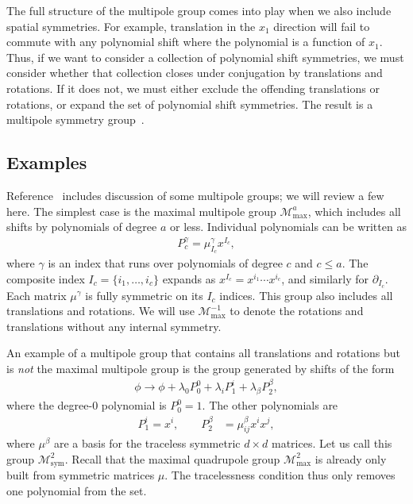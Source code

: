 \documentclass[prb,aps,twocolumn, amsfonts,amsmath,amssymb,nofootinbib,superscriptaddress]{revtex4-2}
\newcommand{\goesto}{\rightarrow}
\renewcommand{\max}{\text{max}}
\newcommand{\mmax}[1]{\mathcal{M}^{#1}_\max}
\begin{document}
The full structure of the multipole group comes into play when we also include spatial symmetries. For example,  translation in the $x_1$ direction will fail to commute with any polynomial shift where the polynomial is a function of $x_1$. Thus, if we want to consider a collection of polynomial shift symmetries, we must consider whether that collection closes under conjugation by translations and rotations. If it does not, we must either exclude the offending translations or rotations, or expand the set of polynomial shift symmetries. The result is a multipole symmetry group~\cite{Gromov2019}.

\subsection{Examples} \label{sub:examples}

Reference~\cite{Gromov2019} includes discussion of some multipole groups; we will review a few here. The simplest case is the maximal multipole group $\mathcal{M}^a_\text{max}$, which includes all shifts by polynomials of degree $a$ or less. Individual polynomials can be written as
\begin{align}
P_c^{\gamma} = \mu^{\gamma}_{I_c}x^{I_c}, \label{eqn:basis}
\end{align}
where $\gamma$ is an index that runs over polynomials of degree $c$ and $c\le a$. The composite index $I_c = \{i_1,\dots,i_c\}$  expands as $x^{I_c}=x^{i_1}\cdots x^{i_c}$, and similarly for $\partial_{I_c}$. Each  matrix  $\mu^{\gamma}$ is fully symmetric on its $I_c$ indices. This group also includes all translations and rotations. We will use $\mmax{-1}$ to denote the rotations and translations without any internal symmetry.

An example of a multipole group that contains all translations and rotations but is \emph{not} the maximal multipole group is the group generated by shifts of the form
\begin{align}
\phi \goesto \phi + \lambda_0 P_0^0 + \lambda_{i} P^{i}_1 + \lambda_{\beta} P^{\beta}_2,
\end{align}
where the degree-0 polynomial is $P_0^0=1$. The other polynomials are
\begin{align}
P_1^{i} = x^i,\quad \quad P_2^{\beta} &= \mu^{\beta}_{ij} x^i x^j,
\end{align}
where $\mu^{\beta}$ are a basis for the traceless symmetric $d\times d$ matrices. Let us call this group $\mathcal{M}^2_{\text{sym}}$. Recall that the maximal quadrupole group $\mathcal{M}^2_{\text{max}}$ is already only built from symmetric matrices $\mu$. The tracelessness condition thus only removes one polynomial from the set. 
\end{document}
